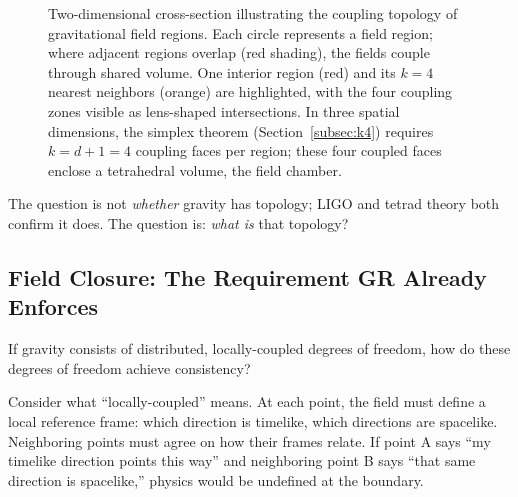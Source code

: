 \documentclass[aps,prd,preprint,superscriptaddress,showpacs,preprintnumbers,amsmath,amssymb,nofootinbib]{revtex4-2}
\begin{document}
\begin{figure}[H]
\centering
{}
\caption{Two-dimensional cross-section illustrating the coupling topology of gravitational field regions. Each circle represents a field region; where adjacent regions overlap (red shading), the fields couple through shared volume. One interior region (red) and its $k = 4$ nearest neighbors (orange) are highlighted, with the four coupling zones visible as lens-shaped intersections. In three spatial dimensions, the simplex theorem (Section~\ref{subsec:k4}) requires $k = d + 1 = 4$ coupling faces per region; these four coupled faces enclose a tetrahedral volume, the field chamber.}
\label{fig:packing}
\end{figure}

The question is not \emph{whether} gravity has topology; LIGO and tetrad theory both confirm it does. The question is: \emph{what is} that topology?

\subsection{Field Closure: The Requirement GR Already Enforces}
\label{subsec:closure}

If gravity consists of distributed, locally-coupled degrees of freedom, how do these degrees of freedom achieve consistency?

Consider what ``locally-coupled'' means. At each point, the field must define a local reference frame: which direction is timelike, which directions are spacelike. Neighboring points must agree on how their frames relate. If point A says ``my timelike direction points this way'' and neighboring point B says ``that same direction is spacelike,'' physics would be undefined at the boundary.
\end{document}
